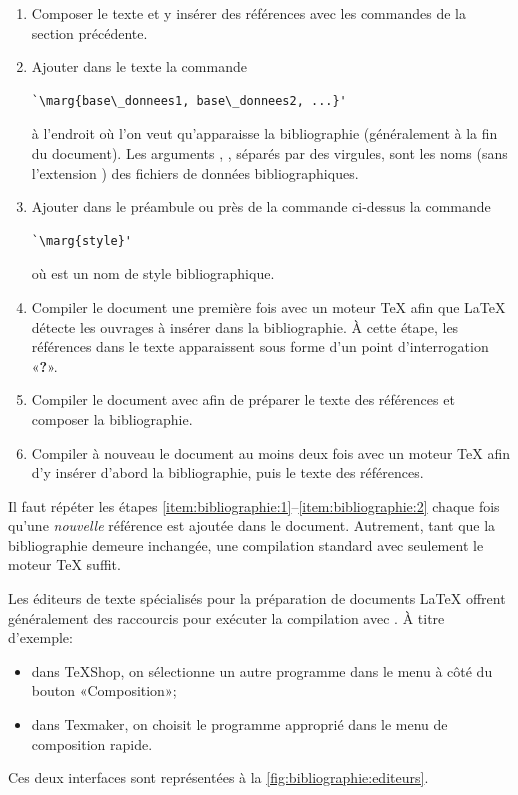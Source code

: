 \begin{enumerate}
\item Composer le texte et y insérer des références avec les commandes
  de la section précédente.
\item Ajouter dans le texte la commande
\begin{lstlisting}
`\marg{base\_donnees1, base\_donnees2, ...}'
\end{lstlisting}
  à l'endroit où l'on veut qu'apparaisse la bibliographie
  (généralement à la fin du document). Les arguments
  , , séparés par des
  virgules, sont les noms (sans l'extension ) des fichiers
  de données bibliographiques.
\item Ajouter dans le préambule ou près de la commande
  \cmdprint{} ci-dessus la commande
\begin{lstlisting}
`\marg{style}'
\end{lstlisting}
  où  est un nom de style bibliographique.
\item \label{item:bibliographie:1} Compiler le document une première
  fois avec un moteur {\TeX} afin que {\LaTeX} détecte les ouvrages à
  insérer dans la bibliographie. À cette étape, les références dans le
  texte apparaissent sous forme d'un point d'interrogation
  «\textbf{?}».
\item Compiler le document avec {\BibTeX} afin de préparer le texte
  des références et composer la bibliographie.
\item \label{item:bibliographie:2} Compiler à nouveau le document au
  moins deux fois avec un moteur {\TeX} afin d'y insérer d'abord la
  bibliographie, puis le texte des références.
\end{enumerate}

Il faut répéter les étapes
\ref*{item:bibliographie:1}--\ref*{item:bibliographie:2} chaque fois
qu'une \emph{nouvelle} référence est ajoutée dans le document.
Autrement, tant que la bibliographie demeure inchangée, une
compilation standard avec seulement le moteur {\TeX} suffit.

Les éditeurs de texte spécialisés pour la préparation de documents
{\LaTeX} offrent généralement des raccourcis pour exécuter la
compilation avec {\BibTeX}. À titre d'exemple:
\begin{itemize}
\item dans TeXShop, on sélectionne un autre programme dans le menu à
  côté du bouton «Composition»;
\item dans Texmaker, on choisit le programme approprié dans le menu de
  composition rapide.
\end{itemize}
Ces deux interfaces sont représentées à la
\autoref{fig:bibliographie:editeurs}.

